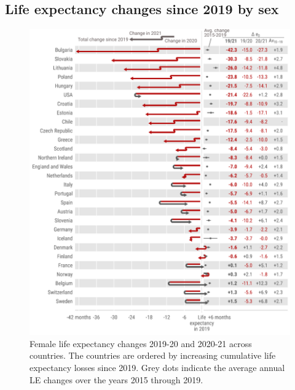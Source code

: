\documentclass[12pt]{article}
\begin{document}
\clearpage

\subsection*{Life expectancy changes since 2019 by sex}

\begin{figure}[hb!]
    \centering
    \includegraphics{figure-a4.pdf}
    \caption{Female life expectancy changes 2019-20 and 2020-21 across countries. The countries are ordered by increasing cumulative life expectancy losses since 2019. Grey dots indicate the average annual LE changes over the years 2015 through 2019.}
    \label{fig:figure-a4}
\end{figure}
\end{document}
